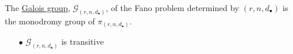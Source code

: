 \documentclass[final]{beamer}
\theoremstyle{thrm}
\newcommand{\blue}[1]{{\color{black!15!blue}\underline{#1}}}
\begin{document}
\begin{frame}
\begin{minipage}[t]{.3\textwidth}



\vspace{1cm}

\begin{minipage}{.65\textwidth}
The \blue{Galois group}, $\mathcal{G}_{(r,n,d_\bullet)}$, of the Fano problem determined by $(r,n,d_\bullet)$ is the monodromy group of $\pi_{(r,n,d_\bullet)}$.
\begin{enumerate}
\item[$\bullet$] $\mathcal{G}_{(r,n,d_\bullet)}$ is transitive


\end{enumerate}
\end{minipage}
\end{minipage}
\end{frame}
\end{document}
